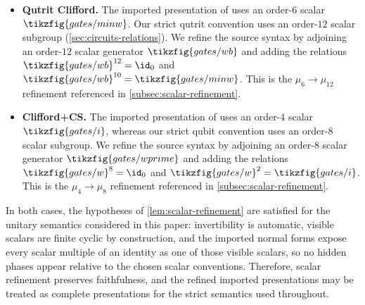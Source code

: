 \begin{itemize}
\item \textbf{Qutrit Clifford.}
The imported presentation of \cite{qutritclifford} uses an order-$6$ scalar
$\tikzfig{gates/minw}$.  Our strict qutrit convention uses an order-$12$ scalar subgroup
(\cref{sec:circuits-relations}).  We refine the source syntax by adjoining an order-$12$ scalar
generator $\tikzfig{gates/wb}$ and adding the relations
\(\tikzfig{gates/wb}^{12}=\id_0\) and
\(\tikzfig{gates/wb}^{10}=\tikzfig{gates/minw}\).
This is the $\mu_6\to\mu_{12}$ refinement referenced in \cref{subsec:scalar-refinement}.

\item \textbf{Clifford+CS.}
The imported presentation of \cite{SelingerCliffordPlusCS} uses an order-$4$ scalar
$\tikzfig{gates/i}$, whereas our strict qubit convention uses an order-$8$ scalar subgroup.
We refine the source syntax by adjoining an order-$8$ scalar generator $\tikzfig{gates/wprime}$
and adding the relations \(\tikzfig{gates/w}^{8}=\id_0\) and
\(\tikzfig{gates/w}^{2}=\tikzfig{gates/i}\).
This is the $\mu_4\to\mu_8$ refinement referenced in \cref{subsec:scalar-refinement}.
\end{itemize}

In both cases, the hypotheses of \cref{lem:scalar-refinement} are satisfied for the unitary
semantics considered in this paper: invertibility is automatic, visible scalars are finite cyclic by
construction, and the imported normal forms expose every scalar multiple of an identity as one of
those visible scalars, so no hidden phases appear relative to the chosen scalar conventions.
Therefore, scalar refinement preserves faithfulness, and the refined imported presentations may be
treated as complete presentations for the strict semantics used throughout.




